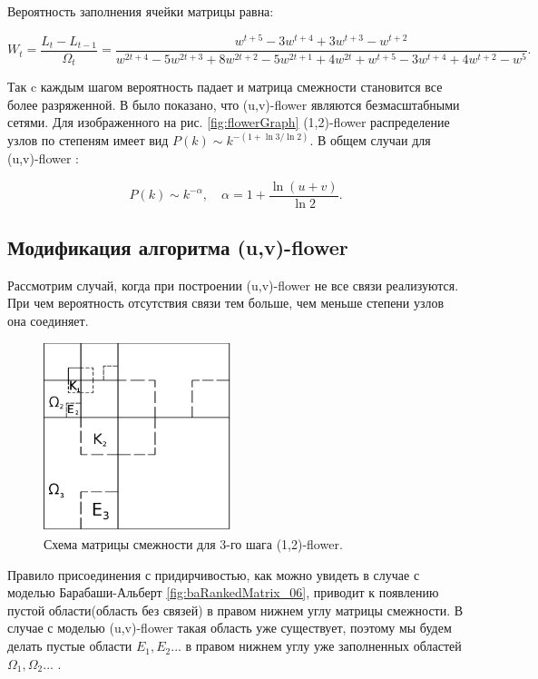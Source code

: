 \documentclass[10pt,aps,pra]{revtex4-1}
\begin{document}
        Вероятность заполнения ячейки матрицы равна:

            \begin{equation}
                W_t=\frac{L_t-L_{t-1}}{\Omega_t}=\frac{w^{t+5}-3w^{t+4}+3w^{t+3}-w^{t+2}}{w^{2t+4}-5w^{2t+3}+8w^{2t+2}-5w^{2t+1}+4w^{2t}+w^{t+5}-3w^{t+4}+4w^{t+2}-w^5}.
            \end{equation}

        Так c каждым шагом вероятность падает и матрица смежности становится все более разряженной.
        В \cite{Dor1} было показано, что (u,v)-flower являются безмасштабными сетями. Для изображенного на рис. \ref{fig:flowerGraph} (1,2)-flower распределение узлов по степеням имеет вид $P(k) \sim k^{-(1+\ln{3} / \ln{2})}$. В общем случаи для (u,v)-flower \cite{Rozenfeld1}:

            \begin{equation}
                P(k) \sim k^{-\alpha}, \quad \alpha = 1+\frac{\ln{(u+v)}}{\ln{2}}.
            \end{equation}

    \subsection{Модификация алгоритма (u,v)-flower}

        Рассмотрим случай, когда при построении (u,v)-flower не все связи реализуются. При чем вероятность отсутствия связи тем больше, чем меньше степени узлов она соединяет.

            \begin{figure}[H]
                \centering
                \includegraphics[height=5.5cm]{graphics/third_n.png}
                \caption{
                \label{fig:flowerMatrixExceptive}
                    Схема матрицы смежности для 3-го шага (1,2)-flower.}
            \end{figure}

        Правило присоединения с придирчивостью, как можно увидеть в случае с моделью Барабаши-Альберт \ref{fig:baRankedMatrix_06}, приводит к появлению пустой области(область без связей) в правом нижнем углу матрицы смежности. В случае с моделью (u,v)-flower такая область уже существует, поэтому мы будем делать пустые области $E_1, E_2...$  в правом нижнем углу уже заполненных областей $\Omega_1, \Omega_2...$ .
\end{document}

